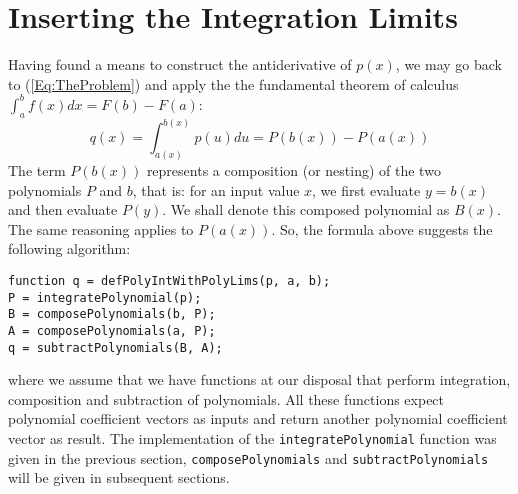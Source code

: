 \section{Inserting the Integration Limits}
Having found a means to construct the antiderivative of $p(x)$, we may go back to (\ref{Eq:TheProblem}) and apply the the fundamental theorem of calculus $\int_a^b f(x) dx = F(b) - F(a)$:
\begin{equation}
 q(x) = \int_{a(x)}^{b(x)} p(u) du = P(b(x)) - P(a(x))
\end{equation}
The term $P(b(x))$ represents a composition (or nesting) of the two polynomials $P$ and $b$, that is: for an input value $x$, we first evaluate $y = b(x)$ and then evaluate $P(y)$. We shall denote this composed polynomial as $B(x)$. The same reasoning applies to $P(a(x))$. So, the formula above suggests the following algorithm:
\begin{verbatim}
function q = defPolyIntWithPolyLims(p, a, b);
P = integratePolynomial(p);
B = composePolynomials(b, P);
A = composePolynomials(a, P);
q = subtractPolynomials(B, A);
\end{verbatim}
where we assume that we have functions at our disposal that perform integration, composition and subtraction of polynomials. All these functions expect polynomial coefficient vectors as inputs and return another polynomial coefficient vector as result. The implementation of the \texttt{integratePolynomial} function was given in the previous section, \texttt{composePolynomials} and \texttt{subtractPolynomials} will be given in subsequent sections.

